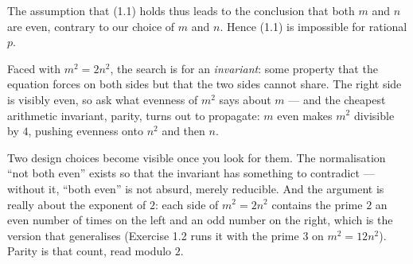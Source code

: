 The assumption that (1.1) holds thus leads to the conclusion that both $m$ and
$n$ are even, contrary to our choice of $m$ and $n$. Hence (1.1) is impossible
for rational $p$.

\begin{unpack}
Faced with $m^2 = 2n^2$, the search is for an \emph{invariant}: some property
that the equation forces on both sides but that the two sides cannot share.
The right side is visibly even, so ask what evenness of $m^2$ says about $m$
--- and the cheapest arithmetic invariant, parity, turns out to propagate:
$m$ even makes $m^2$ divisible by $4$, pushing evenness onto $n^2$ and then
$n$.

Two design choices become visible once you look for them. The normalisation
``not both even'' exists so that the invariant has something to contradict ---
without it, ``both even'' is not absurd, merely reducible. And the argument is
really about the exponent of $2$: each side of $m^2 = 2n^2$ contains the prime
$2$ an even number of times on the left and an odd number on the right, which
is the version that generalises (Exercise 1.2 runs it with the prime $3$ on
$m^2 = 12n^2$). Parity is that count, read modulo $2$.
\end{unpack}

